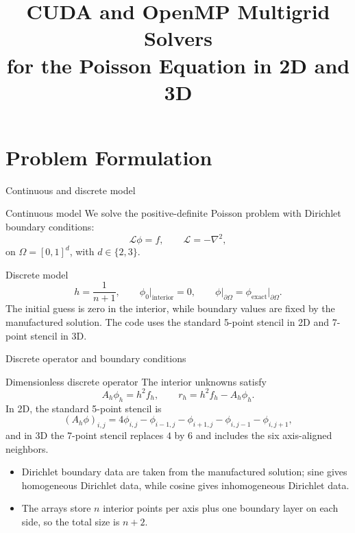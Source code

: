 \documentclass[aspectratio=169]{beamer}
\title[CUDA/OpenMP MG Poisson 2D/3D]{CUDA and OpenMP Multigrid Solvers\\for the Poisson Equation in 2D and 3D}
\newcommand{\frametitlesub}[2]{#2}
\begin{document}
\begingroup
\AtBeginSection[]{}
\section{Problem Formulation}


\begin{frame}[t]{\frametitlesub{Governing equation and discretization}{Continuous and discrete model}}
    \footnotesize
    \begin{block}{Continuous model}
        We solve the positive-definite Poisson problem with Dirichlet boundary conditions:
        \[
            \mathcal{L}\phi = f, \qquad \mathcal{L} = -\nabla^2,
        \]
        on \(\Omega = [0,1]^d\), with \(d \in \{2,3\}\).
    \end{block}

    \begin{block}{Discrete model}
        \[
            h = \frac{1}{n+1}, \qquad \phi_0\vert_{\text{interior}} = 0, \qquad
            \phi\vert_{\partial\Omega} = \phi_{\text{exact}}\vert_{\partial\Omega}.
        \]
        The initial guess is zero in the interior, while boundary values are fixed by the manufactured solution.
        The code uses the standard 5-point stencil in 2D and 7-point stencil in 3D.
    \end{block}
\end{frame}

\begin{frame}[t]{\frametitlesub{Governing equation and discretization}{Discrete operator and boundary conditions}}
    \footnotesize
    \begin{block}{Dimensionless discrete operator}
        The interior unknowns satisfy
        \[
            A_h \phi_h = h^2 f_h, \qquad r_h = h^2 f_h - A_h \phi_h.
        \]
        In 2D, the standard 5-point stencil is
        \[
            (A_h \phi)_{i,j} = 4\phi_{i,j} - \phi_{i-1,j} - \phi_{i+1,j} - \phi_{i,j-1} - \phi_{i,j+1},
        \]
        and in 3D the 7-point stencil replaces \(4\) by \(6\) and includes the six axis-aligned neighbors.
    \end{block}

    \begin{itemize}
        \item Dirichlet boundary data are taken from the manufactured solution; sine gives homogeneous Dirichlet data, while cosine gives inhomogeneous Dirichlet data.
        \item The arrays store \(n\) interior points per axis plus one boundary layer on each side, so the total size is \(n+2\).
    \end{itemize}
\end{frame}
\end{document}
